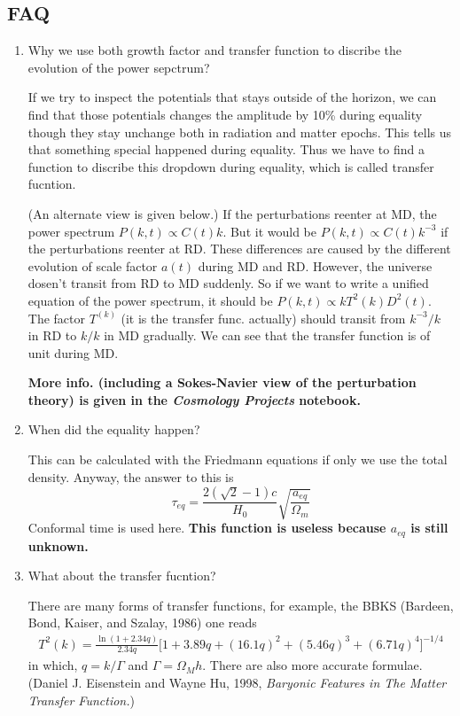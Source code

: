 \subsection{FAQ}
\begin{enumerate}

\item Why we use both growth factor and transfer function to discribe the evolution of the power sepctrum?

If we try to inspect the potentials that stays outside of the horizon, we can find that those potentials changes the amplitude by 10\% during equality though they stay unchange both in radiation and matter epochs. This tells us that something special happened during equality. Thus we have to find a function to discribe this dropdown during equality, which is called transfer fucntion.

(An alternate view is given below.)
If the perturbations reenter at MD, the power spectrum $P(k,t)\propto C(t)k$. But it would be $P(k,t)\propto C(t)k^{-3}$ if the perturbations reenter at RD. These differences are caused by the different evolution of scale factor $a(t)$ during MD and RD. However, the universe dosen't transit from RD to MD suddenly. So if we want to write a unified equation of the power spectrum, it should be $P(k,t)\propto kT^2(k)D^2(t)$. The factor $T^(k)$ (it is the transfer func. actually) should transit from $k^{-3}/k$ in RD to $k/k$ in MD gradually. We can see that the transfer function is of unit during MD.

{\bf\color{red}More info. (including a Sokes-Navier view of the perturbation theory) is given in the {\it Cosmology Projects} notebook.}

\item When did the equality happen?

This can be calculated with the Friedmann equations if only we use the total density. Anyway, the answer to this is
\begin{equation}
\tau_{eq}=\frac{2(\sqrt 2 -1)c}{H_0}\sqrt{\frac{a_{eq}}{\Omega_m}}
\end{equation}
Conformal time is used here.{\bf\color{red} This function is useless because $a_{eq}$ is still unknown. }

\item
What about the transfer fucntion?

There are many forms of transfer functions, for example, the BBKS (Bardeen, Bond, Kaiser, and Szalay, 1986) one reads
\begin{eqnarray}
T^2(k)=\frac{\ln{(1+2.34q)}}{2.34q}\bigg[ 1+3.89q+(16.1q)^2+(5.46q)^3+(6.71q)^4 \bigg]^{-1/4}
\end{eqnarray}
in which, $q=k/\Gamma$ and $\Gamma=\Omega_Mh$.
There are also more accurate formulae. (Daniel J. Eisenstein and Wayne Hu, 1998, {\it Baryonic Features in The Matter Transfer Function.})


\end{enumerate}
